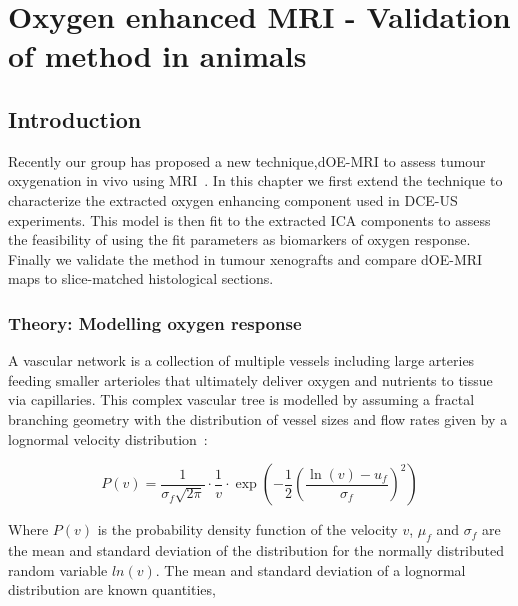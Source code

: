 
\chapter{Oxygen enhanced MRI - Validation of method in animals}
\label{ch:oemri2}

\section{Introduction}

Recently our group has proposed a new technique,\ac{dOE-MRI} to assess tumour oxygenation in vivo using MRI~\cite{Moosvi:2018ca}.
In this chapter we first extend the technique to characterize the extracted oxygen enhancing component used in \ac{DCE-US} experiments.
This model is then fit to the extracted \ac{ICA} components to assess the feasibility of using the fit parameters as biomarkers of oxygen response.
Finally we validate the method in tumour xenografts and compare \ac{dOE-MRI} maps to slice-matched histological sections.

\subsection{Theory: Modelling oxygen response}
\label{sec:lognormalfitting_theory}
A vascular network is a collection of multiple vessels including large arteries feeding smaller arterioles that ultimately deliver oxygen and nutrients to tissue via capillaries.
This complex vascular tree is modelled by assuming a fractal branching geometry with the distribution of vessel sizes and flow rates given by a lognormal velocity distribution~\cite{Qian:2000ca}:

\begin{equation}
P(v)=\frac{1}{\sigma_{f} \sqrt{2 \pi}} \cdot \frac{1}{v} \cdot \exp \left(-\frac{1}{2}\left(\frac{\ln (v)-u_{f}}{\sigma_{f}}\right)^{2}\right)
\end{equation}

Where $P(v)$ is the probability density function of the velocity $v$, $\mu_f$ and $\sigma_f$ are the mean and standard deviation of the distribution for the normally distributed random variable $ln(v)$.
The mean and standard deviation of a lognormal distribution are known quantities,

